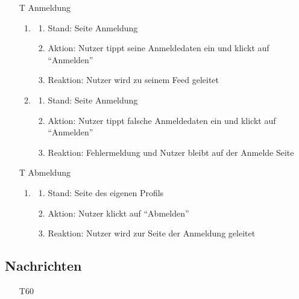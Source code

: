 \documentclass[parskip=full]{scrartcl}
\begin{document}
\begin{itemize}
\item[T] Anmeldung
\begin{enumerate}
	\item
	\begin{enumerate}[nosep]	
	\item Stand: Seite Anmeldung
	\item Aktion: Nutzer tippt seine Anmeldedaten ein und klickt auf “Anmelden”
	\item Reaktion:  Nutzer wird zu seinem Feed geleitet
\end{enumerate} 
\item
	\begin{enumerate}[nosep]	
	\item Stand: Seite Anmeldung
	\item Aktion: Nutzer tippt falsche Anmeldedaten ein und klickt auf “Anmelden”
	\item Reaktion: Fehlermeldung und Nutzer bleibt auf der Anmelde Seite
\end{enumerate}
\end{enumerate}



\item[T] Abmeldung
\begin{enumerate}
	\item
	\begin{enumerate}[nosep]	
	\item Stand: Seite des eigenen Profils
	\item Aktion: Nutzer klickt auf “Abmelden”
	\item Reaktion:  Nutzer wird zur Seite der Anmeldung geleitet
\end{enumerate} 
\end{enumerate}

 
		\end{itemize}
	
	
	\subsection{Nachrichten}
		
		\begin{itemize}
			\item[T60]
	
		\end{itemize}
\end{document}
